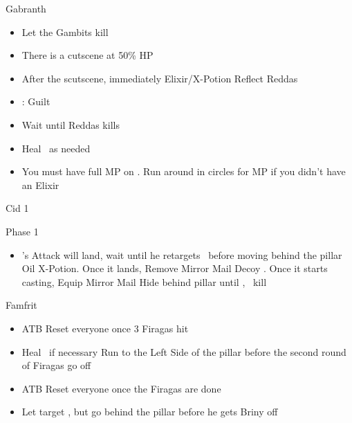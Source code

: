 \begin{battle}{Gabranth}
	\begin{itemize}
		\item Let the Gambits kill
		\item There is a cutscene at 50\% HP
		\item After the scutscene, immediately Elixir/X-Potion \vaan
		      \penelof Reflect Reddas
		\item {}: Guilt
		\item Wait until Reddas kills
		\item Heal \vaan\ as needed
		\item You must have full MP on \vaan. Run around in circles for MP if you didn't have an Elixir
	\end{itemize}
\end{battle}
\begin{battle}{Cid 1 \item  Phase 1}
	\begin{itemize}
		\battlewait
		\penelof X-Potion Reddas
		\ashef Dispel 
		\vaanf Star running towards a pillar.
		\item {}'s Attack will land, wait until he retargets \vaan\ before moving behind the pillar
		      \penelof Oil 
		      \vaanf X-Potion. Once it lands, Remove Mirror Mail
		      \ashef Decoy \vaan. Once it starts casting, Equip Mirror Mail
		      \vaanf Hide behind pillar until \ashe, \penelo\ kill 
	\end{itemize}
\end{battle}
\begin{battle}{Famfrit}
	\begin{itemize}
		\vaanf Flee to the Right Pillar
		\ashef Dispell 
		\item ATB Reset everyone once 3 Firagas hit 
		\item Heal \vaan\ if necessary
		      \vaanf Run to the Left Side of the pillar before the second round of Firagas go off
		      \beliasfreeze{}
		\item ATB Reset everyone once the Firagas are done
		\item Let  target \vaan, but go behind the pillar before he gets Briny off
	\end{itemize}
\end{battle}
